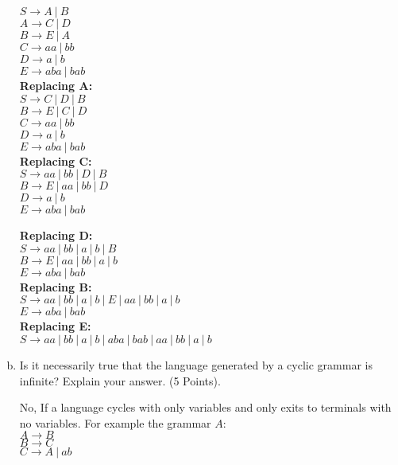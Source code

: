 \documentclass{article}
\begin{document}
\begin{enumerate}[(a)]
\begin{minipage}[c]{0.5\linewidth}
$S \rightarrow A\ |\ B$ \\
$A \rightarrow C\ |\ D$ \\
$B \rightarrow E\ |\ A$ \\
$C \rightarrow aa\ |\ bb$ \\
$D \rightarrow a\ |\ b$ \\
$E \rightarrow aba\ |\ bab$ \\
\textbf{Replacing A:}\\
$S \rightarrow C\ |\ D\ |\ B$ \\
$B \rightarrow E\ |\ C\ |\ D$ \\
$C \rightarrow aa\ |\ bb$ \\
$D \rightarrow a\ |\ b$ \\
$E \rightarrow aba\ |\ bab$ \\
\textbf{Replacing C:} \\
$S \rightarrow aa\ |\ bb\ |\ D\ |\ B$ \\
$B \rightarrow E\ |\ aa\ |\ bb\ |\ D$ \\
$D \rightarrow a\ |\ b$ \\
$E \rightarrow aba\ |\ bab$ \\
\end{minipage}
\begin{minipage}[c]{0.5\linewidth}
\textbf{Replacing D:} \\
$S \rightarrow aa\ |\ bb\ |\ a\ |\ b\ |\ B$ \\
$B \rightarrow E\ |\ aa\ |\ bb\ |\ a\ |\ b$ \\
$E \rightarrow aba\ |\ bab$ \\
\textbf{Replacing B:}\\
$S \rightarrow aa\ |\ bb\ |\ a\ |\ b\ |\ E\ |\ aa\ |\ bb\ |\ a\ |\ b$ \\
$E \rightarrow aba\ |\ bab$ \\
\textbf{Replacing E:}\\
$S \rightarrow aa\ |\ bb\ |\ a\ |\ b\ |\ aba\ |\ bab\ |\ aa\ |\ bb\ |\ a\ |\ b$ \\
\end{minipage}

\item Is it necessarily true that the language generated by a cyclic grammar is infinite? Explain your
answer. (5 Points).

No, If a language cycles with only variables and only exits to terminals with no variables.
For example the grammar $A$: \\
$A \rightarrow B $ \\
$B \rightarrow C $ \\
$C \rightarrow A\ |\ ab$



\end{enumerate}
\end{document}
